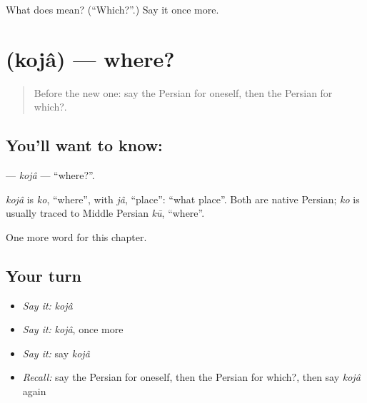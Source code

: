 \begin{tcolorbox}[breakable,colback=teal!4,colframe=teal!35!black,title={Before you move on}]
What does  mean? (\textquotedblleft{}Which?\textquotedblright{}.) Say it once more.
\end{tcolorbox}
\section[\texorpdfstring{\fa{کجا} (kojâ)}{کجا (kojâ)}]{ (kojâ) — where?}

\label{lesson:FA-C85-koja}



\begin{quote}
Before the new one: say the Persian for oneself, then the Persian for which?.
\end{quote}

\subsection*{You'll want to know: }
\textbf{} — \emph{kojâ} — \textquotedblleft{}where?\textquotedblright{}.

\begin{cousinweb}
\emph{kojâ} is \emph{ko}, \textquotedblleft{}where\textquotedblright{}, with \emph{jâ}, \textquotedblleft{}place\textquotedblright{}: \textquotedblleft{}what place\textquotedblright{}. Both are native Persian; \emph{ko} is usually traced to Middle Persian \emph{kū}, \textquotedblleft{}where\textquotedblright{}.
\end{cousinweb}

\begin{grammarlens}[title={What you've built}]
One more word for this chapter.
\end{grammarlens}

\subsection*{Your turn}
\begin{itemize}
\raggedright
  \item \emph{Say it:} \emph{kojâ}
  \item \emph{Say it:} \emph{kojâ}, once more
  \item \emph{Say it:} say \emph{kojâ}
  \item \emph{Recall:} say the Persian for oneself, then the Persian for which?, then say \emph{kojâ} again
\end{itemize}

